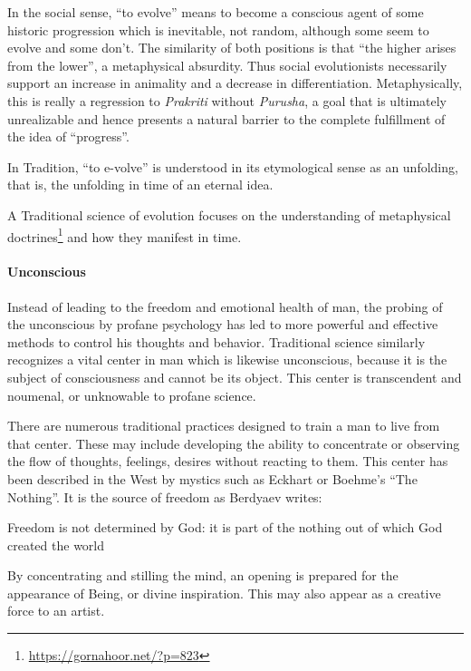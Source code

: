 In the social sense, ``to evolve'' means to become a conscious agent of some historic progression which is inevitable, not random, although some seem to evolve and some don't. The similarity of both positions is that ``the higher arises from the lower'', a metaphysical absurdity. Thus social evolutionists necessarily support an increase in animality and a decrease in differentiation. Metaphysically, this is really a regression to \emph{Prakriti} without \emph{Purusha}, a goal that is ultimately unrealizable and hence presents a natural barrier to the complete fulfillment of the idea of ``progress''.

In Tradition, ``to e-volve'' is understood in its etymological sense as an unfolding, that is, the unfolding in time of an eternal idea.

A Traditional science of evolution focuses on the understanding of metaphysical doctrines\footnote{\url{https://gornahoor.net/?p=823}} and how they manifest in time.

\paragraph{Unconscious}


Instead of leading to the freedom and emotional health of man, the probing of the unconscious by profane psychology has led to more powerful and effective methods to control his thoughts and behavior. Traditional science similarly recognizes a vital center in man which is likewise unconscious, because it is the subject of consciousness and cannot be its object. This center is transcendent and noumenal, or unknowable to profane science.

There are numerous traditional practices designed to train a man to live from that center. These may include developing the ability to concentrate or observing the flow of thoughts, feelings, desires without reacting to them. This center has been described in the West by mystics such as Eckhart or Boehme's ``The Nothing''. It is the source of freedom as Berdyaev writes:

\begin{quotex}
Freedom is not determined by God: it is part of the nothing out of which God created the world
\end{quotex}


By concentrating and stilling the mind, an opening is prepared for the appearance of Being, or divine inspiration. This may also appear as a creative force to an artist.


